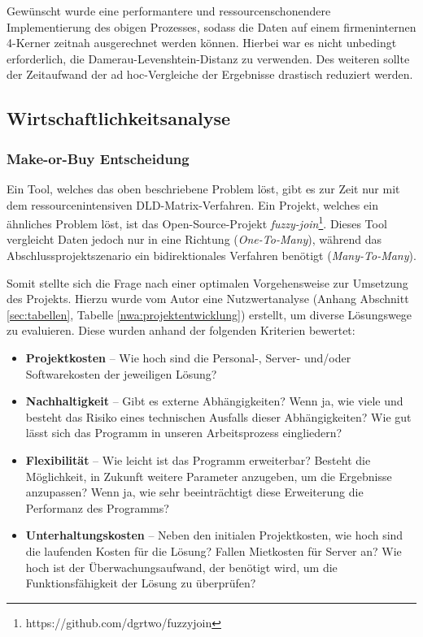 Gewünscht wurde eine performantere und ressourcenschonendere Implementierung des obigen Prozesses,
sodass die Daten auf einem firmeninternen 4-Kerner zeitnah ausgerechnet werden können.
Hierbei war es nicht unbedingt erforderlich, die Damerau-Levenshtein-Distanz zu verwenden.
Des weiteren sollte der Zeitaufwand der ad hoc-Vergleiche der Ergebnisse drastisch reduziert werden.\par




\subsection{Wirtschaftlichkeitsanalyse}
\subsubsection{Make-or-Buy Entscheidung}
Ein Tool, welches das oben beschriebene Problem löst, gibt es zur Zeit nur mit dem
ressourcenintensiven DLD-Matrix-Verfahren. Ein Projekt, welches ein ähnliches
Problem löst, ist das Open-Source-Projekt \textit{fuzzy-join}\footnote{https://github.com/dgrtwo/fuzzyjoin}.
Dieses Tool vergleicht Daten jedoch nur in eine Richtung (\textit{One-To-Many}),
während das Abschlussprojektszenario ein bidirektionales Verfahren benötigt (\textit{Many-To-Many}).\par

Somit stellte sich die Frage nach einer optimalen Vorgehensweise zur Umsetzung des
Projekts. Hierzu wurde vom Autor eine Nutzwertanalyse (Anhang Abschnitt \ref{sec:tabellen}, Tabelle \ref{nwa:projektentwicklung}) erstellt, um diverse Lösungswege zu evaluieren.
Diese wurden anhand der folgenden Kriterien bewertet:


\begin{itemize}
    \item \textbf{Projektkosten} -- Wie hoch sind die Personal-, Server- und/oder Softwarekosten der jeweiligen Lösung?

    \item \textbf{Nachhaltigkeit} -- Gibt es externe Abhängigkeiten? Wenn ja, wie viele und besteht das Risiko eines technischen Ausfalls dieser Abhängigkeiten? Wie gut lässt sich das Programm in unseren Arbeitsprozess eingliedern?

    \item \textbf{Flexibilität} -- Wie leicht ist das Programm erweiterbar? Besteht die Möglichkeit, in Zukunft weitere Parameter anzugeben, um die Ergebnisse anzupassen? Wenn ja, wie sehr beeinträchtigt diese Erweiterung die Performanz des Programms?

    \item \textbf{Unterhaltungskosten} -- Neben den initialen Projektkosten, wie hoch sind die laufenden Kosten für die Lösung? Fallen Mietkosten für Server an? Wie hoch ist der Überwachungsaufwand, der benötigt wird, um die Funktionsfähigkeit der Lösung zu überprüfen?

\end{itemize}



